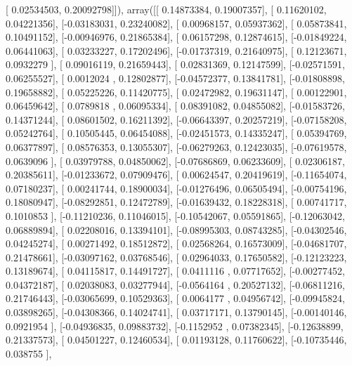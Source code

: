 \documentclass{article}
\begin{document}
       [ 0.02534503,  0.20092798]]), array([[ 0.14873384,  0.19007357],
       [ 0.11620102,  0.04221356],
       [-0.03183031,  0.23240082],
       [ 0.00968157,  0.05937362],
       [ 0.05873841,  0.10491152],
       [-0.00946976,  0.21865384],
       [ 0.06157298,  0.12874615],
       [-0.01849224,  0.06441063],
       [ 0.03233227,  0.17202496],
       [-0.01737319,  0.21640975],
       [ 0.12123671,  0.0932279 ],
       [ 0.09016119,  0.21659443],
       [ 0.02831369,  0.12147599],
       [-0.02571591,  0.06255527],
       [ 0.0012024 ,  0.12802877],
       [-0.04572377,  0.13841781],
       [-0.01808898,  0.19658882],
       [ 0.05225226,  0.11420775],
       [ 0.02472982,  0.19631147],
       [ 0.00122901,  0.06459642],
       [ 0.0789818 ,  0.06095334],
       [ 0.08391082,  0.04855082],
       [-0.01583726,  0.14371244],
       [ 0.08601502,  0.16211392],
       [-0.06643397,  0.20257219],
       [-0.07158208,  0.05242764],
       [ 0.10505445,  0.06454088],
       [-0.02451573,  0.14335247],
       [ 0.05394769,  0.06377897],
       [ 0.08576353,  0.13055307],
       [-0.06279263,  0.12423035],
       [-0.07619578,  0.0639096 ],
       [ 0.03979788,  0.04850062],
       [-0.07686869,  0.06233609],
       [ 0.02306187,  0.20385611],
       [-0.01233672,  0.07909476],
       [ 0.00624547,  0.20419619],
       [-0.11654074,  0.07180237],
       [ 0.00241744,  0.18900034],
       [-0.01276496,  0.06505494],
       [-0.00754196,  0.18080947],
       [-0.08292851,  0.12472789],
       [-0.01639432,  0.18228318],
       [ 0.00741717,  0.1010853 ],
       [-0.11210236,  0.11046015],
       [-0.10542067,  0.05591865],
       [-0.12063042,  0.06889894],
       [ 0.02208016,  0.13394101],
       [-0.08995303,  0.08743285],
       [-0.04302546,  0.04245274],
       [ 0.00271492,  0.18512872],
       [ 0.02568264,  0.16573009],
       [-0.04681707,  0.21478661],
       [-0.03097162,  0.03768546],
       [ 0.02964033,  0.17650582],
       [-0.12123223,  0.13189674],
       [ 0.04115817,  0.14491727],
       [ 0.0411116 ,  0.07717652],
       [-0.00277452,  0.04372187],
       [ 0.02038083,  0.03277944],
       [-0.0564164 ,  0.20527132],
       [-0.06811216,  0.21746443],
       [-0.03065699,  0.10529363],
       [ 0.0064177 ,  0.04956742],
       [-0.09945824,  0.03898265],
       [-0.04308366,  0.14024741],
       [ 0.03717171,  0.13790145],
       [-0.00140146,  0.0921954 ],
       [-0.04936835,  0.09883732],
       [-0.1152952 ,  0.07382345],
       [-0.12638899,  0.21337573],
       [ 0.04501227,  0.12460534],
       [ 0.01193128,  0.11760622],
       [-0.10735446,  0.038755  ],
\end{document}
